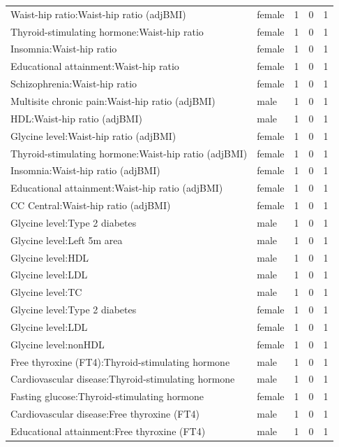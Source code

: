 \begin{table}[ht]
\begin{tabular}{llrrr}
  Waist-hip ratio:Waist-hip ratio (adjBMI) & female &   1 &   0 &   1 \\ 
  Thyroid-stimulating hormone:Waist-hip ratio & female &   1 &   0 &   1 \\ 
  Insomnia:Waist-hip ratio & female &   1 &   0 &   1 \\ 
  Educational attainment:Waist-hip ratio & female &   1 &   0 &   1 \\ 
  Schizophrenia:Waist-hip ratio & female &   1 &   0 &   1 \\ 
  Multisite chronic pain:Waist-hip ratio (adjBMI) & male &   1 &   0 &   1 \\ 
  HDL:Waist-hip ratio (adjBMI) & male &   1 &   0 &   1 \\ 
  Glycine level:Waist-hip ratio (adjBMI) & female &   1 &   0 &   1 \\ 
  Thyroid-stimulating hormone:Waist-hip ratio (adjBMI) & female &   1 &   0 &   1 \\ 
  Insomnia:Waist-hip ratio (adjBMI) & female &   1 &   0 &   1 \\ 
  Educational attainment:Waist-hip ratio (adjBMI) & female &   1 &   0 &   1 \\ 
  CC Central:Waist-hip ratio (adjBMI) & female &   1 &   0 &   1 \\ 
  Glycine level:Type 2 diabetes & male &   1 &   0 &   1 \\ 
  Glycine level:Left 5m area & male &   1 &   0 &   1 \\ 
  Glycine level:HDL & male &   1 &   0 &   1 \\ 
  Glycine level:LDL & male &   1 &   0 &   1 \\ 
  Glycine level:TC & male &   1 &   0 &   1 \\ 
  Glycine level:Type 2 diabetes & female &   1 &   0 &   1 \\ 
  Glycine level:LDL & female &   1 &   0 &   1 \\ 
  Glycine level:nonHDL & female &   1 &   0 &   1 \\ 
  Free thyroxine (FT4):Thyroid-stimulating hormone & male &   1 &   0 &   1 \\ 
  Cardiovascular disease:Thyroid-stimulating hormone & male &   1 &   0 &   1 \\ 
  Fasting glucose:Thyroid-stimulating hormone & female &   1 &   0 &   1 \\ 
  Cardiovascular disease:Free thyroxine (FT4) & male &   1 &   0 &   1 \\ 
  Educational attainment:Free thyroxine (FT4) & male &   1 &   0 &   1 \\ 

\end{tabular}
\end{table}
